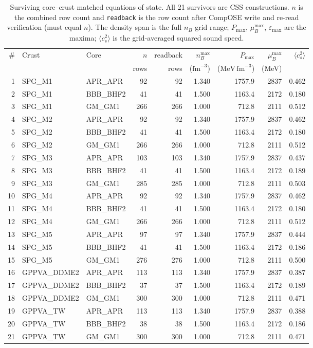 \documentclass[aps,prc,reprint,notitlepage]{revtex4-2}
\begin{document}
\begin{table}[t]
\centering
\caption{Surviving core--crust matched equations of state.  All 21
survivors are CSS constructions.  $n$ is the combined row count and
\texttt{readback} is the row count after CompOSE write and re-read
verification (must equal $n$).  The density span is the full $n_B$ grid
range; $P_{\max}$, $\mu_B^{\max}$, $\varepsilon_{\max}$ are the maxima;
$\langle c_s^2\rangle$ is the grid-averaged squared sound speed.}
\label{tab:survivors}
\small
\setlength{\tabcolsep}{4pt}
\begin{tabular}{@{}r l l r r r r r r@{}}
\toprule
\# & Crust & Core & $n$ & readback & $n_B^{\max}$ & $P_{\max}$ & $\mu_B^{\max}$ & $\langle c_s^2\rangle$ \\
 & & & rows & rows & ($\mathrm{fm}^{-3}$) & ($\mathrm{MeV\,fm}^{-3}$) & (MeV) & \\
\midrule
1 & SPG\_M1 & APR\_APR & 92 & 92 & 1.340 & 1757.9 & 2837 & 0.462 \\
2 & SPG\_M1 & BBB\_BHF2 & 41 & 41 & 1.500 & 1163.4 & 2172 & 0.180 \\
3 & SPG\_M1 & GM\_GM1 & 266 & 266 & 1.000 & 712.8 & 2111 & 0.512 \\
4 & SPG\_M2 & APR\_APR & 92 & 92 & 1.340 & 1757.9 & 2837 & 0.462 \\
5 & SPG\_M2 & BBB\_BHF2 & 41 & 41 & 1.500 & 1163.4 & 2172 & 0.180 \\
6 & SPG\_M2 & GM\_GM1 & 266 & 266 & 1.000 & 712.8 & 2111 & 0.512 \\
7 & SPG\_M3 & APR\_APR & 103 & 103 & 1.340 & 1757.9 & 2837 & 0.437 \\
8 & SPG\_M3 & BBB\_BHF2 & 41 & 41 & 1.500 & 1163.4 & 2172 & 0.189 \\
9 & SPG\_M3 & GM\_GM1 & 285 & 285 & 1.000 & 712.8 & 2111 & 0.503 \\
10 & SPG\_M4 & APR\_APR & 92 & 92 & 1.340 & 1757.9 & 2837 & 0.462 \\
11 & SPG\_M4 & BBB\_BHF2 & 41 & 41 & 1.500 & 1163.4 & 2172 & 0.180 \\
12 & SPG\_M4 & GM\_GM1 & 266 & 266 & 1.000 & 712.8 & 2111 & 0.512 \\
13 & SPG\_M5 & APR\_APR & 97 & 97 & 1.340 & 1757.9 & 2837 & 0.444 \\
14 & SPG\_M5 & BBB\_BHF2 & 41 & 41 & 1.500 & 1163.4 & 2172 & 0.186 \\
15 & SPG\_M5 & GM\_GM1 & 276 & 276 & 1.000 & 712.8 & 2111 & 0.500 \\
16 & GPPVA\_DDME2 & APR\_APR & 113 & 113 & 1.340 & 1757.9 & 2837 & 0.387 \\
17 & GPPVA\_DDME2 & BBB\_BHF2 & 37 & 37 & 1.500 & 1163.4 & 2172 & 0.189 \\
18 & GPPVA\_DDME2 & GM\_GM1 & 300 & 300 & 1.000 & 712.8 & 2111 & 0.471 \\
19 & GPPVA\_TW & APR\_APR & 113 & 113 & 1.340 & 1757.9 & 2837 & 0.388 \\
20 & GPPVA\_TW & BBB\_BHF2 & 38 & 38 & 1.500 & 1163.4 & 2172 & 0.186 \\
21 & GPPVA\_TW & GM\_GM1 & 300 & 300 & 1.000 & 712.8 & 2111 & 0.471 \\
\bottomrule
\end{tabular}
\end{table}
\end{document}
